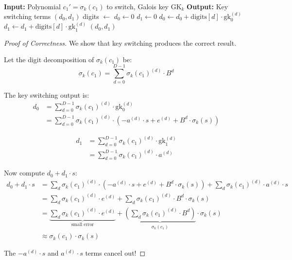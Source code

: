 \documentclass[11pt,a4paper]{article}
\begin{document}
\begin{algorithm}[H]
\caption{Key Switching}
\begin{algorithmic}[1]
    \State \textbf{Input:} Polynomial $c_1' = \sigma_k(c_1)$ to switch, Galois key $\text{GK}_k$
    \State \textbf{Output:} Key switching terms $(d_0, d_1)$
    \State
    \State {}
    \State digits $\gets$ 
    \State
    \State {}
    \State $d_0 \gets 0$
    \State $d_1 \gets 0$
        \State $d_0 \gets d_0 + \text{digits}[d] \cdot \text{gk}_0^{(d)}$
        \State $d_1 \gets d_1 + \text{digits}[d] \cdot \text{gk}_1^{(d)}$
    \EndFor
    \State
    \State \Return $(d_0, d_1)$
\EndFunction
\end{algorithmic}
\end{algorithm}

\begin{proof}[Proof of Correctness]
We show that key switching produces the correct result.

Let the digit decomposition of $\sigma_k(c_1)$ be:
\[
\sigma_k(c_1) = \sum_{d=0}^{D-1} \sigma_k(c_1)^{(d)} \cdot B^d
\]

The key switching output is:
\begin{align*}
d_0 &= \sum_{d=0}^{D-1} \sigma_k(c_1)^{(d)} \cdot \text{gk}_0^{(d)} \\
&= \sum_{d=0}^{D-1} \sigma_k(c_1)^{(d)} \cdot (-a^{(d)} \cdot s + e^{(d)} + B^d \cdot \sigma_k(s))
\end{align*}

\begin{align*}
d_1 &= \sum_{d=0}^{D-1} \sigma_k(c_1)^{(d)} \cdot \text{gk}_1^{(d)} \\
&= \sum_{d=0}^{D-1} \sigma_k(c_1)^{(d)} \cdot a^{(d)}
\end{align*}

Now compute $d_0 + d_1 \cdot s$:
\begin{align*}
d_0 + d_1 \cdot s &= \sum_{d} \sigma_k(c_1)^{(d)} \cdot (-a^{(d)} \cdot s + e^{(d)} + B^d \cdot \sigma_k(s)) + \sum_{d} \sigma_k(c_1)^{(d)} \cdot a^{(d)} \cdot s \\
&= \sum_{d} \sigma_k(c_1)^{(d)} \cdot e^{(d)} + \sum_{d} \sigma_k(c_1)^{(d)} \cdot B^d \cdot \sigma_k(s) \\
&= \underbrace{\sum_{d} \sigma_k(c_1)^{(d)} \cdot e^{(d)}}_{\text{small error}} + \underbrace{\left(\sum_{d} \sigma_k(c_1)^{(d)} \cdot B^d\right)}_{\sigma_k(c_1)} \cdot \sigma_k(s) \\
&\approx \sigma_k(c_1) \cdot \sigma_k(s)
\end{align*}

The $-a^{(d)} \cdot s$ and $a^{(d)} \cdot s$ terms cancel out!
\end{proof}
\end{document}
